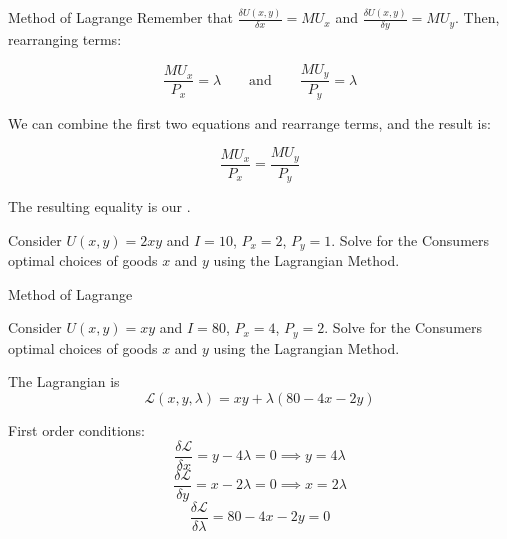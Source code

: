 \documentclass{beamer}
\begin{document}
\begin{frame}{Method of Lagrange}
  Remember that $\frac{\delta U(x,y)}{\delta x} = MU_x$ and $\frac{\delta U(x,y)}{\delta y} = MU_y$. Then, rearranging terms:

  $$
  \frac{MU_x}{P_x} = \lambda \qquad \text{and} \qquad \frac{MU_y}{P_y} = \lambda
  $$

  \bigskip 
  We can combine the first two equations and rearrange terms, and the result is:

  $$
  \frac{MU_x}{P_x} = \frac{MU_y}{P_y}
  $$
  
  \bigskip
  The resulting equality is our .
\end{frame}

\begin{frame}
  
  \bigskip
  Consider $U(x,y) = 2xy$ and $I=10$, $P_{x} = 2$, $P_{y} = 1$. Solve for the Consumers optimal choices of goods $x$ and $y$ using the Lagrangian Method.
\end{frame}

\begin{frame}{Method of Lagrange}
  
  \bigskip
  Consider $U(x,y) = xy$ and $I=80$, $P_{x} = 4$, $P_{y}=2$. Solve for the Consumers optimal choices of goods $x$ and $y$ using the Lagrangian Method.
\end{frame}

\begin{frame}

  \bigskip
  The Lagrangian is
  $$
    \mathcal{L}(x,y,\lambda) = xy + \lambda(80 - 4x - 2y)
  $$

  \bigskip
  First order conditions:
  $$
    \frac{\delta \mathcal{L}}{\delta x} = y - 4\lambda = 0 \implies y = 4\lambda
  $$
  $$
    \frac{\delta \mathcal{L}}{\delta y} = x - 2\lambda = 0 \implies x = 2\lambda
  $$
  $$
    \frac{\delta \mathcal{L}}{\delta \lambda} = 80 - 4x - 2y = 0
  $$
\end{frame}
\end{document}
